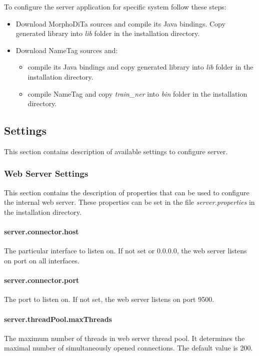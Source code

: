 To configure the server application for specific system follow these steps:
\begin{itemize}
\item Download MorphoDiTa sources and compile its Java bindings. Copy generated
library into \emph{lib} folder in the installation directory.
\item Download NameTag sources and:
	\begin{itemize}
	\item compile its Java bindings and copy generated library into \emph{lib}
	folder in the installation directory.
	\item compile NameTag and copy \emph{train\_ner} into \emph{bin} folder in
	the installation directory.
	\end{itemize}
\end{itemize}

\subsection{Settings}
\label{sec:ServerSettings}

This section contains description of available settings to configure \textan{}
server.

\subsubsection{Web Server Settings}
\label{sssec:WebServerSettings}
This section contains the description of properties that can be used to
configure the internal web server. These properties can be set in the file
\emph{server.properties} in the installation directory.

\paragraph{server.connector.host}
The particular interface to listen on. If not set or 0.0.0.0, the web server
listens on port on all interfaces.

\paragraph{server.connector.port}
The port to listen on. If not set, the web server listens on port 9500.

\paragraph{server.threadPool.maxThreads}
The maximum number of threads in web server thread pool. It determines the
maximal number of simultaneously opened connections. The default value is 200.

